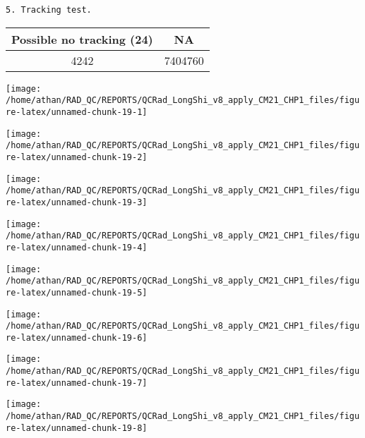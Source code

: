 \documentclass[
  10pt,
  a4paper,oneside]{article}
\begin{document}
\begin{verbatim}
5. Tracking test.
\end{verbatim}

\begin{longtable}[]{@{}cc@{}}
\toprule
Possible no tracking (24) & NA\tabularnewline
\midrule
\endhead
4242 & 7404760\tabularnewline
\bottomrule
\end{longtable}

\begin{center}\texttt{[image: /home/athan/RAD\_QC/REPORTS/QCRad\_LongShi\_v8\_apply\_CM21\_CHP1\_files/figure-latex/unnamed-chunk-19-1]} \end{center}

\begin{center}\texttt{[image: /home/athan/RAD\_QC/REPORTS/QCRad\_LongShi\_v8\_apply\_CM21\_CHP1\_files/figure-latex/unnamed-chunk-19-2]} \end{center}

\begin{center}\texttt{[image: /home/athan/RAD\_QC/REPORTS/QCRad\_LongShi\_v8\_apply\_CM21\_CHP1\_files/figure-latex/unnamed-chunk-19-3]} \end{center}

\begin{center}\texttt{[image: /home/athan/RAD\_QC/REPORTS/QCRad\_LongShi\_v8\_apply\_CM21\_CHP1\_files/figure-latex/unnamed-chunk-19-4]} \end{center}

\begin{center}\texttt{[image: /home/athan/RAD\_QC/REPORTS/QCRad\_LongShi\_v8\_apply\_CM21\_CHP1\_files/figure-latex/unnamed-chunk-19-5]} \end{center}

\begin{center}\texttt{[image: /home/athan/RAD\_QC/REPORTS/QCRad\_LongShi\_v8\_apply\_CM21\_CHP1\_files/figure-latex/unnamed-chunk-19-6]} \end{center}

\begin{center}\texttt{[image: /home/athan/RAD\_QC/REPORTS/QCRad\_LongShi\_v8\_apply\_CM21\_CHP1\_files/figure-latex/unnamed-chunk-19-7]} \end{center}

\begin{center}\texttt{[image: /home/athan/RAD\_QC/REPORTS/QCRad\_LongShi\_v8\_apply\_CM21\_CHP1\_files/figure-latex/unnamed-chunk-19-8]} \end{center}
\end{document}
